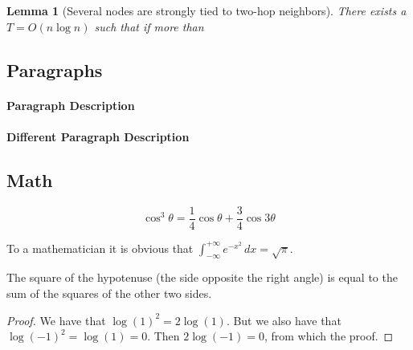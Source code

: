 \documentclass[
10pt, %
a4paper, %
oneside, %
headinclude,footinclude, %
BCOR5mm, %
]{scrartcl}
\newtheorem{lemma}[theorem]{\textbf{Lemma}}
\begin{document}
\begin{lemma}[Several nodes are strongly tied to two-hop neighbors]\label{lem:6}
	There exists a $T = O(n \log n)$ such that if more than 
\end{lemma}

\subsection{Paragraphs}

\lipsum[6] %

\paragraph{Paragraph Description} \lipsum[7] %

\paragraph{Different Paragraph Description} \lipsum[8] %


\subsection{Math}

\lipsum[4] %

\begin{equation}
\cos^3 \theta =\frac{1}{4}\cos\theta+\frac{3}{4}\cos 3\theta
\label{eq:refname2}
\end{equation}

\lipsum[5] %

\begin{definition}[Gauss] 
To a mathematician it is obvious that
$\int_{-\infty}^{+\infty}
e^{-x^2}\,dx=\sqrt{\pi}$. 
\end{definition} 

\begin{theorem}[Pythagoras]
The square of the hypotenuse (the side opposite the right angle) is equal to the sum of the squares of the other two sides.
\end{theorem}

\begin{proof} 
We have that $\log(1)^2 = 2\log(1)$.
But we also have that $\log(-1)^2=\log(1)=0$.
Then $2\log(-1)=0$, from which the proof.
\end{proof}
\end{document}
